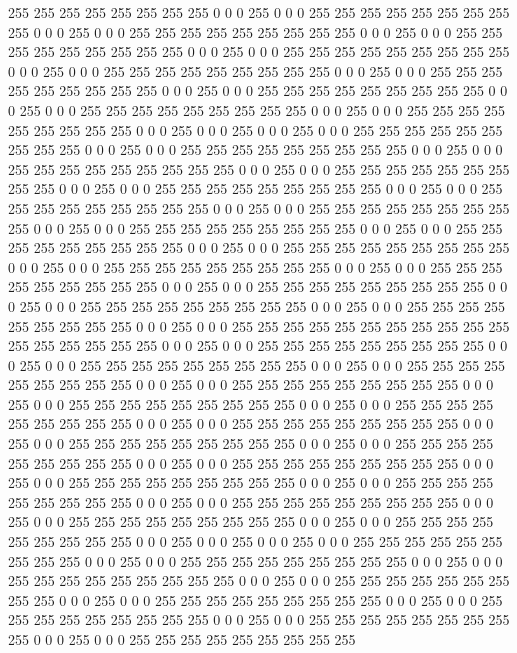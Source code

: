 255 255 255 255 255 255 255 255 0 0 0 255 0 0 0 255 255 255 255 255 255 255 255 255 0 0 0 255 0 0 0 255
255 255 255 255 255 255 255 255 0 0 0 255 0 0 0 255 255 255 255 255 255 255 255 255 0 0 0 255 0 0 0 255
255 255 255 255 255 255 255 255 0 0 0 255 0 0 0 255 255 255 255 255 255 255 255 255 0 0 0 255 0 0 0 255
255 255 255 255 255 255 255 255 0 0 0 255 0 0 0 255 255 255 255 255 255 255 255 255 0 0 0 255 0 0 0 255
255 255 255 255 255 255 255 255 0 0 0 255 0 0 0 255 255 255 255 255 255 255 255 255 0 0 0 255 0 0 0 255
0 0 0 255 0 0 0 255 255 255 255 255 255 255 255 255 0 0 0 255 0 0 0 255 255 255 255 255 255 255 255 255
0 0 0 255 0 0 0 255 255 255 255 255 255 255 255 255 0 0 0 255 0 0 0 255 255 255 255 255 255 255 255 255
0 0 0 255 0 0 0 255 255 255 255 255 255 255 255 255 0 0 0 255 0 0 0 255 255 255 255 255 255 255 255 255
0 0 0 255 0 0 0 255 255 255 255 255 255 255 255 255 0 0 0 255 0 0 0 255 255 255 255 255 255 255 255 255
0 0 0 255 0 0 0 255 255 255 255 255 255 255 255 255 0 0 0 255 0 0 0 255 255 255 255 255 255 255 255 255
0 0 0 255 0 0 0 255 255 255 255 255 255 255 255 255 0 0 0 255 0 0 0 255 255 255 255 255 255 255 255 255
0 0 0 255 0 0 0 255 255 255 255 255 255 255 255 255 0 0 0 255 0 0 0 255 255 255 255 255 255 255 255 255
0 0 0 255 0 0 0 255 255 255 255 255 255 255 255 255 0 0 0 255 0 0 0 255 255 255 255 255 255 255 255 255
255 255 255 255 255 255 255 255 0 0 0 255 0 0 0 255 255 255 255 255 255 255 255 255 0 0 0 255 0 0 0 255
255 255 255 255 255 255 255 255 0 0 0 255 0 0 0 255 255 255 255 255 255 255 255 255 0 0 0 255 0 0 0 255
255 255 255 255 255 255 255 255 0 0 0 255 0 0 0 255 255 255 255 255 255 255 255 255 0 0 0 255 0 0 0 255
255 255 255 255 255 255 255 255 0 0 0 255 0 0 0 255 255 255 255 255 255 255 255 255 0 0 0 255 0 0 0 255
255 255 255 255 255 255 255 255 0 0 0 255 0 0 0 255 255 255 255 255 255 255 255 255 0 0 0 255 0 0 0 255
255 255 255 255 255 255 255 255 0 0 0 255 0 0 0 255 255 255 255 255 255 255 255 255 0 0 0 255 0 0 0 255
255 255 255 255 255 255 255 255 0 0 0 255 0 0 0 255 255 255 255 255 255 255 255 255 0 0 0 255 0 0 0 255
255 255 255 255 255 255 255 255 0 0 0 255 0 0 0 255 255 255 255 255 255 255 255 255 0 0 0 255 0 0 0 255
0 0 0 255 0 0 0 255 255 255 255 255 255 255 255 255 0 0 0 255 0 0 0 255 255 255 255 255 255 255 255 255
0 0 0 255 0 0 0 255 255 255 255 255 255 255 255 255 0 0 0 255 0 0 0 255 255 255 255 255 255 255 255 255
0 0 0 255 0 0 0 255 255 255 255 255 255 255 255 255 0 0 0 255 0 0 0 255 255 255 255 255 255 255 255 255
0 0 0 255 0 0 0 255 255 255 255 255 255 255 255 255 0 0 0 255 0 0 0 255 255 255 255 255 255 255 255 255
